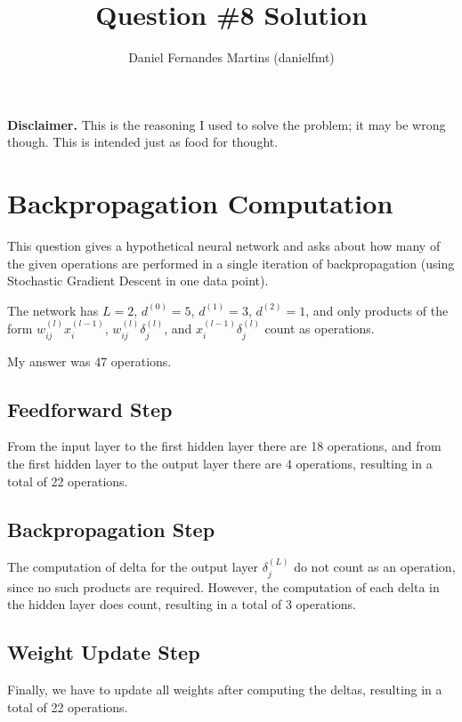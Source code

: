 \documentclass{article}
\author{Daniel Fernandes Martins (danielfmt)}
\title{Question \#8 Solution}
\begin{document}
\maketitle

\textbf{Disclaimer.} This is the reasoning I used to solve the problem; it
may be wrong though. This is intended just as food for thought.

\section{Backpropagation Computation}

This question gives a hypothetical neural network and asks about how many
of the given operations are performed in a single iteration of backpropagation
(using Stochastic Gradient Descent in one data point).

The network has $L=2$, $d^{(0)}=5$, $d^{(1)}=3$, $d^{(2)}=1$, and only products
of the form $w_{ij}^{(l)}x_i^{(l-1)}$, $w_{ij}^{(l)}\delta_j^{(l)}$, and
$x_i^{(l-1)}\delta_j^{(l)}$ count as operations.

My answer was 47 operations.

\subsection{Feedforward Step}

From the input layer to the first hidden layer there are 18 operations, and from
the first hidden layer to the output layer there are 4 operations, resulting in
a total of 22 operations.

\subsection{Backpropagation Step}

The computation of delta for the output layer $\delta_j^{(L)}$ do not count as
an operation, since no such products are required. However, the computation of
each delta in the hidden layer does count, resulting in a total of 3 operations.

\subsection{Weight Update Step}

Finally, we have to update all weights after computing the deltas, resulting
in a total of 22 operations.
\end{document}
